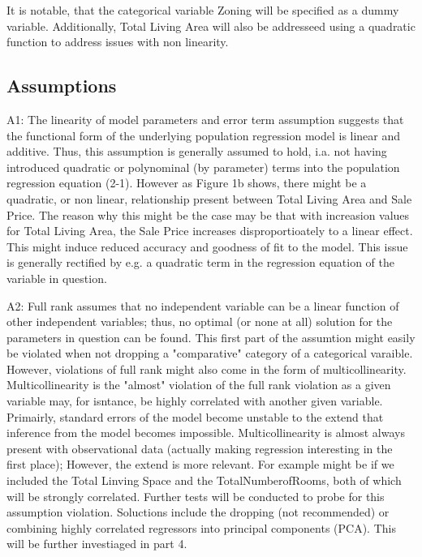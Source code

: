\documentclass[a4paper]{article}
\begin{document}
It is notable, that the categorical variable Zoning will be specified as a dummy variable. Additionally, Total Living Area will also be addresseed using a quadratic function to address issues with non linearity. 

\subsection{Assumptions}

\indent A1: The linearity of model parameters and error term assumption suggests that the functional form of the underlying population regression model is linear and additive. Thus, this assumption is generally assumed to hold, i.a. not having introduced quadratic or polynominal (by parameter) terms into the population regression equation (2-1). However as Figure 1b shows, there might be a quadratic, or non linear, relationship  present between Total Living Area and Sale Price. The reason why this might be the case may be that with increasion values for Total Living Area, the Sale Price increases disproportioately to a linear effect. This might induce reduced accuracy and goodness of fit to the model. This issue is generally rectified by e.g. a quadratic term in the regression equation of the variable in question.

\indent A2: Full rank assumes that no independent variable can be a linear function of other independent variables; thus, no optimal (or none at all) solution for the parameters in question can be found. This first part of the assumtion might easily be violated when not dropping a "comparative" category of a categorical varaible. However, violations of full rank might also come in the form of multicollinearity. Multicollinearity is the "almost" violation of the full rank violation as a given variable may, for isntance, be highly correlated with another given variable. Primairly, standard errors of the model become unstable to the extend that inference from the model becomes impossible. Multicollinearity is almost always present with observational data (actually making regression interesting in the first place); However, the extend is more relevant. For example might be if we included the Total Linving Space and the TotalNumberofRooms, both of which will be strongly correlated. Further tests will be conducted to probe for this assumption violation. Soluctions include the dropping (not recommended) or combining highly correlated regressors into principal components (PCA). This will be further investiaged in part 4.
\end{document}

